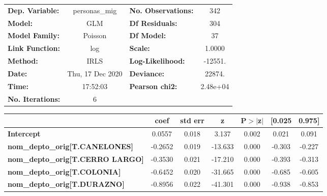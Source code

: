 \begin{center}
\begin{tabular}{lclc}
\toprule
\textbf{Dep. Variable:}                     &  personas\_mig   & \textbf{  No. Observations:  } &      342    \\
\textbf{Model:}                             &       GLM        & \textbf{  Df Residuals:      } &      304    \\
\textbf{Model Family:}                      &     Poisson      & \textbf{  Df Model:          } &       37    \\
\textbf{Link Function:}                     &       log        & \textbf{  Scale:             } &    1.0000   \\
\textbf{Method:}                            &       IRLS       & \textbf{  Log-Likelihood:    } &   -12551.   \\
\textbf{Date:}                              & Thu, 17 Dec 2020 & \textbf{  Deviance:          } &    22874.   \\
\textbf{Time:}                              &     17:52:03     & \textbf{  Pearson chi2:      } &  2.48e+04   \\
\textbf{No. Iterations:}                    &        6         & \textbf{                     } &             \\
\bottomrule
\end{tabular}
\begin{tabular}{lcccccc}
                                            & \textbf{coef} & \textbf{std err} & \textbf{z} & \textbf{P$> |$z$|$} & \textbf{[0.025} & \textbf{0.975]}  \\
\midrule
\textbf{Intercept}                          &       0.0557  &        0.018     &     3.137  &         0.002        &        0.021    &        0.091     \\
\textbf{nom\_depto\_orig[T.CANELONES]}      &      -0.2652  &        0.019     &   -13.633  &         0.000        &       -0.303    &       -0.227     \\
\textbf{nom\_depto\_orig[T.CERRO LARGO]}    &      -0.3530  &        0.021     &   -17.210  &         0.000        &       -0.393    &       -0.313     \\
\textbf{nom\_depto\_orig[T.COLONIA]}        &      -0.6452  &        0.020     &   -31.665  &         0.000        &       -0.685    &       -0.605     \\
\textbf{nom\_depto\_orig[T.DURAZNO]}        &      -0.8956  &        0.022     &   -41.301  &         0.000        &       -0.938    &       -0.853     \\

\end{tabular}
\end{center}
